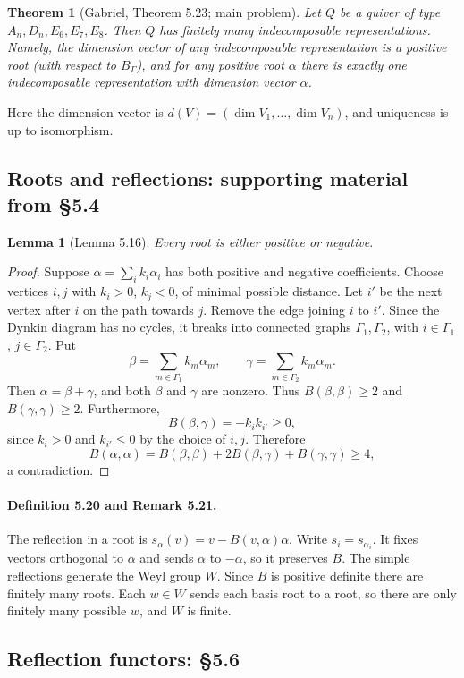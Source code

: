 \documentclass[UTF8,11pt,a4paper]{ctexart}
\newtheorem*{theorem}{Theorem}
\newtheorem*{lemma}{Lemma}
\theoremstyle{definition}\newtheorem*{definition}{Definition}
\theoremstyle{remark}\newtheorem*{remark}{Remark}
\begin{document}
\begin{theorem}[Gabriel, Theorem 5.23; main problem]
Let $Q$ be a quiver of type $A_n,D_n,E_6,E_7,E_8$. Then $Q$ has finitely many indecomposable representations. Namely, the dimension vector of any indecomposable representation is a positive root (with respect to $B_\Gamma$), and for any positive root $\alpha$ there is exactly one indecomposable representation with dimension vector $\alpha$.
\end{theorem}
Here the dimension vector is $d(V)=(\dim V_1,\ldots,\dim V_n)$, and uniqueness is up to isomorphism.

\subsection*{Roots and reflections: supporting material from §5.4}
\begin{lemma}[Lemma 5.16]
Every root is either positive or negative.
\end{lemma}
\begin{proof}
Suppose $\alpha=\sum_i k_i\alpha_i$ has both positive and negative coefficients. Choose vertices $i,j$ with $k_i>0$, $k_j<0$, of minimal possible distance. Let $i'$ be the next vertex after $i$ on the path towards $j$. Remove the edge joining $i$ to $i'$. Since the Dynkin diagram has no cycles, it breaks into connected graphs $\Gamma_1,\Gamma_2$, with $i\in\Gamma_1$, $j\in\Gamma_2$. Put
\[
\beta=\sum_{m\in\Gamma_1}k_m\alpha_m,\qquad
\gamma=\sum_{m\in\Gamma_2}k_m\alpha_m.
\]
Then $\alpha=\beta+\gamma$, and both $\beta$ and $\gamma$ are nonzero. Thus $B(\beta,\beta)\ge2$ and $B(\gamma,\gamma)\ge2$. Furthermore,
\[
B(\beta,\gamma)=-k_i k_{i'}\ge0,
\]
since $k_i>0$ and $k_{i'}\le0$ by the choice of $i,j$. Therefore
\[
B(\alpha,\alpha)=B(\beta,\beta)+2B(\beta,\gamma)+B(\gamma,\gamma)\ge4,
\]
a contradiction.
\end{proof}
\paragraph{Definition 5.20 and Remark 5.21.}
The reflection in a root is $s_\alpha(v)=v-B(v,\alpha)\alpha$. Write $s_i=s_{\alpha_i}$. It fixes vectors orthogonal to $\alpha$ and sends $\alpha$ to $-\alpha$, so it preserves $B$. The simple reflections generate the Weyl group $W$. Since $B$ is positive definite there are finitely many roots. Each $w\in W$ sends each basis root to a root, so there are only finitely many possible $w$, and $W$ is finite.

\subsection*{Reflection functors: §5.6}
\end{document}

